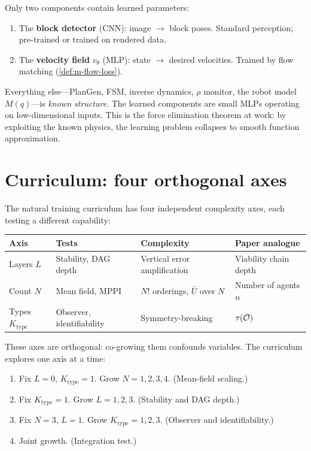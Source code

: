 \begin{remark}
\label{rem:m-learned-known}
Only two components contain learned parameters:
\begin{enumerate}[label=(\roman*),nosep]
  \item The \textbf{block detector} (CNN): image $\to$ block
  poses.  Standard perception; pre-trained or trained on
  rendered data.
  \item The \textbf{velocity field} $v_\theta$ (MLP): state $\to$
  desired velocities.  Trained by flow matching
  (\cref{def:m-flow-loss}).
\end{enumerate}
Everything else---PlanGen, FSM, inverse dynamics, $\rho$ monitor,
the robot model $M(q)$---is \emph{known structure}.  The learned
components are small MLPs operating on low-dimensional inputs.
This is the force elimination theorem at work: by exploiting the
known physics, the learning problem collapses to smooth
function approximation.
\end{remark}


\section{Curriculum: four orthogonal axes}\label{sec:m-curriculum}

The natural training curriculum has four independent complexity axes,
each testing a different capability:

\begin{center}
\begin{tabular}{@{}lp{3cm}p{3.5cm}p{3.5cm}@{}}
\toprule
\textbf{Axis} & \textbf{Tests} & \textbf{Complexity}
  & \textbf{Paper analogue} \\
\midrule
Layers $L$ & Stability, DAG depth & Vertical error amplification
  & Viability chain depth \\
Count $N$ & Mean field, MPPI & $N!$ orderings, $\bar{U}$ over $N$
  & Number of agents $n$ \\
Types $K_\mathrm{type}$ & Observer, identifiability
  & Symmetry-breaking & $\tau(\mathcal{O})$ \\
\bottomrule
\end{tabular}
\end{center}

These axes are orthogonal: co-growing them confounds variables.
The curriculum explores one axis at a time:
\begin{enumerate}[label=(\roman*),nosep]
  \item Fix $L = 0$, $K_\mathrm{type} = 1$.  Grow
  $N = 1, 2, 3, 4$.  (Mean-field scaling.)
  \item Fix $K_\mathrm{type} = 1$.  Grow $L = 1, 2, 3$.
  (Stability and DAG depth.)
  \item Fix $N = 3$, $L = 1$.  Grow
  $K_\mathrm{type} = 1, 2, 3$.  (Observer and identifiability.)
  \item Joint growth.  (Integration test.)
\end{enumerate}

